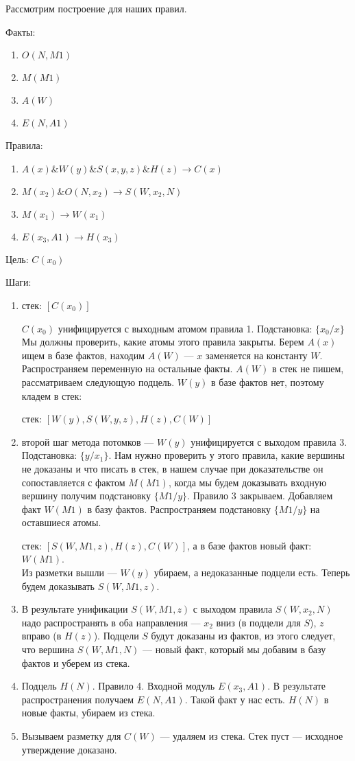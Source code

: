 Рассмотрим построение для наших правил.

Факты:
\begin{enumerate}
  \item $O(N,M1)$
  \item $M(M1)$
  \item $A(W)$
  \item $E(N,A1)$
\end{enumerate}

Правила:
\begin{enumerate}
  \item $A(x) \& W(y) \& S(x, y, z) \& H(z) \rightarrow C(x)$
  \item $M(x_2) \& O(N, x_2) \rightarrow S(W, x_2, N)$
  \item $M(x_1) \rightarrow W(x_1)$
  \item $E(x_3, A1) \rightarrow H(x_3)$
\end{enumerate}

Цель: $C(x_0)$

Шаги:
\begin{enumerate}
  \item стек: $[ C(x_0) ]$

  $C(x_0)$ унифицируется с выходным атомом правила 1. Подстановка: $\{x_0/x\}$
  Мы должны проверить, какие атомы этого правила закрыты. Берем $A(x)$ ищем в базе фактов, находим $A(W)$ --- $x$ заменяется на константу $W$. Распространяем переменную на остальные факты. $A(W)$ в стек не пишем, рассматриваем следующую подцель. $W(y)$ в базе фактов нет, поэтому кладем в стек:
	
  стек: $[ W(y), S(W,y,z), H(z), C(W) ]$

  \item второй шаг метода потомков --- $W(y)$ унифицируется с выходом правила 3. Подстановка: $\{y/x_1\}$. Нам нужно проверить у этого правила, какие вершины не доказаны и что писать в стек, в нашем случае при доказательстве он сопоставляется с фактом $M(M1)$, когда мы будем доказывать  входную вершину получим подстановку $\{M1/y\}$. Правило 3 закрываем. Добавляем факт $W(M1)$ в базу фактов. Распространяем подстановку $\{M1/y\}$ на оставшиеся атомы.

	стек: $[ S(W, M1, z), H(z), C(W) ]$, а в базе фактов новый факт: $W(M1)$. \\
	Из разметки вышли --- $W(y)$ убираем, а недоказанные подцели есть. Теперь будем доказывать $S(W, M1, z)$.

  \item В результате унификации $S(W,M1,z)$ с выходом правила $S(W, x_2, N)$ надо распространять в оба направления --- $x_2$ вниз (в подцели для $S$), $z$ вправо (в $H(z)$). Подцели $S$ будут доказаны из фактов, из этого следует, что вершина $S(W, M1, N)$ --- новый факт, который мы добавим в базу фактов и уберем из стека.

  \item Подцель $H(N)$. Правило 4. Входной модуль $E(x_3, A1)$. В результате распространения получаем $E(N, A1)$. Такой факт у нас есть. $H(N)$ в новые факты, убираем из стека.
  
  \item Вызываем разметку для $C(W)$ --- удаляем из стека. Стек пуст --- исходное утверждение доказано.
\end{enumerate}
